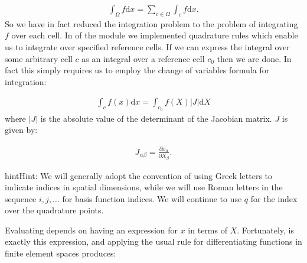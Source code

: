 \documentclass{book}
\begin{document}
\label{\detokenize{5_functions:equation-integral_sum}}\begin{equation}\label{equation:5_functions:integral_sum}
\begin{split}\int_\Omega f \mathrm{d} x = \sum_{c\in\Omega} \int_c f \mathrm{d} x.\end{split}
\end{equation}
So we have in fact reduced the integration problem to the problem of
integrating \(f\) over each cell. In {\hyperref[\detokenize{1_quadrature::doc}]{}}
of the module we implemented quadrature rules which enable us to
integrate over specified reference cells. If we can express the
integral over some arbitrary cell \(c\) as an integral over a reference
cell \(c_0\) then we are done. In fact this simply requires us to employ
the change of variables formula for integration:

\label{\detokenize{5_functions:equation-5_functions:4}}\begin{equation}\label{equation:5_functions:5_functions:4}
\begin{split}\int_{c} f(x) \mathrm{d} x = \int_{c_0} f(X) |J|\mathrm{d} X\end{split}
\end{equation}
where \(|J|\) is the absolute value of the determinant of the Jacobian
matrix. \(J\) is given by:

\label{\detokenize{5_functions:equation-jacobian_def}}\begin{equation}\label{equation:5_functions:jacobian_def}
\begin{split}J_{\alpha\beta} = \frac{\partial x_\alpha}{\partial X_\beta}.\end{split}
\end{equation}
\begin{sphinxadmonition}{hint}{Hint:}
We will generally adopt the convention of using Greek letters to
indicate indices in spatial dimensions, while we will use Roman
letters in the sequence \(i,j,\ldots\) for basis function indices. We
will continue to use \(q\) for the index over the quadrature points.
\end{sphinxadmonition}

Evaluating {\hyperref[\detokenize{5_functions:equation-jacobian_def}]{}} depends on having an expression for \(x\) in
terms of \(X\). Fortunately, {\hyperref[\detokenize{5_functions:equation-change}]{}} is exactly this expression,
and applying the usual rule for differentiating functions in finite
element spaces produces:
\end{document}
